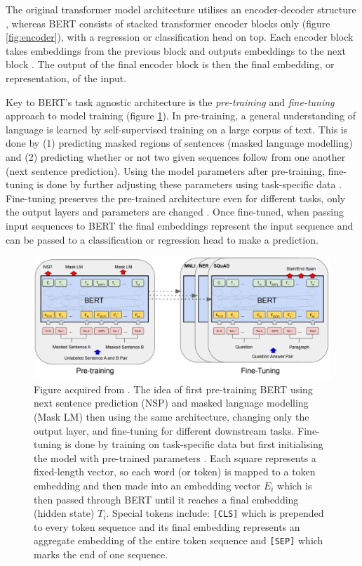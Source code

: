 \documentclass{article}
\begin{document}
The original transformer model architecture utilises an encoder-decoder structure \cite{vaswani2017attention}, whereas BERT consists of stacked transformer encoder blocks only (figure \ref{fig:encoder}), with a regression or classification head on top. Each encoder block takes embeddings from the previous block and outputs embeddings to the next block \cite{devlin2019bert, vaswani2017attention}. The output of the final encoder block is then the final embedding, or representation, of the input.

Key to BERT's task agnostic architecture is the \textit{pre-training} and \textit{fine-tuning} approach to model training (figure \ref{fig:bert_pt_ft}). In pre-training, a general understanding of language is learned by self-supervised training on a large corpus of text. This is done by (1) predicting masked regions of sentences (masked language modelling) and (2) predicting whether or not two given sequences follow from one another (next sentence prediction). Using the model parameters after pre-training, fine-tuning is done by further adjusting these parameters using task-specific data \cite{devlin2019bert, vaswani2017attention}. Fine-tuning preserves the pre-trained architecture even for different tasks, only the output layers and parameters are changed \cite{devlin2019bert}. Once fine-tuned, when passing input sequences to BERT the final embeddings represent the input sequence and can be passed to a classification or regression head to make a prediction.

\begin{figure}[H]
    \centering
    \includegraphics[width=1\linewidth]{images/bert.png}
    \caption{Figure acquired from \cite{devlin2019bert}. The idea of first pre-training BERT using next sentence prediction (NSP) and masked language modelling (Mask LM) then using the same architecture, changing only the output layer, and fine-tuning for different downstream tasks. Fine-tuning is done by training on task-specific data but first initialising the model with pre-trained parameters \cite{devlin2019bert}. Each square represents a fixed-length vector, so each word (or token) is mapped to a token embedding and then made into an embedding vector $E_i$ which is then passed through BERT until it reaches a final embedding (hidden state) $T_i$. Special tokens include: \texttt{[CLS]} which is prepended to every token sequence and its final embedding represents an aggregate embedding of the entire token sequence and \texttt{[SEP]} which marks the end of one sequence.}
    \label{fig:bert_pt_ft}
\end{figure}
\end{document}
